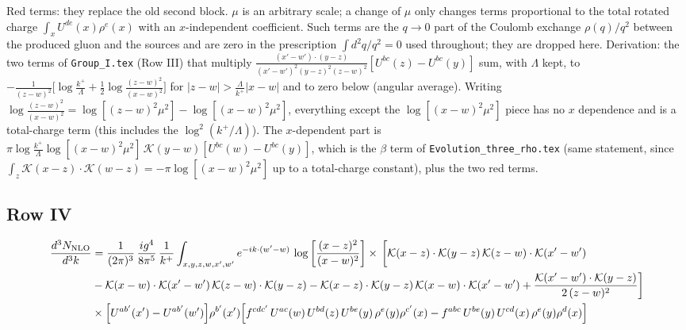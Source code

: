\documentclass[9pt]{article}
\numberwithin{equation}{section}
\begin{document}
{\color{red}Red terms: they replace the old second block. $\mu$ is an arbitrary scale; a change of $\mu$ only changes terms proportional to the total rotated charge $\int_{x}U^{de}(x)\rho^{e}(x)$ with an $x$-independent coefficient. Such terms are the $q\to0$ part of the Coulomb exchange $\rho(q)/q^{2}$ between the produced gluon and the sources and are zero in the prescription $\int d^{2}q/q^{2}=0$ used throughout; they are dropped here. Derivation: the two terms of \texttt{Group\_I.tex} (Row III) that multiply $\frac{(x'-w')\cdot(y-z)}{(x'-w')^{2}(y-z)^{2}(z-w)^{2}}[U^{bc}(z)-U^{bc}(y)]$ sum, with $\Lambda$ kept, to $-\frac{1}{(z-w)^{2}}\big[\log\frac{k^{+}}{\Lambda}+\frac12\log\frac{(z-w)^{2}}{(x-w)^{2}}\big]$ for $|z-w|>\frac{\Lambda}{k^{+}}|x-w|$ and to zero below (angular average). Writing $\log\frac{(z-w)^{2}}{(x-w)^{2}}=\log[(z-w)^{2}\mu^{2}]-\log[(x-w)^{2}\mu^{2}]$, everything except the $\log[(x-w)^{2}\mu^{2}]$ piece has no $x$ dependence and is a total-charge term (this includes the $\log^{2}(k^{+}/\Lambda)$). The $x$-dependent part is $\pi\log\frac{k^{+}}{\Lambda}\log[(x-w)^{2}\mu^{2}]\,\mathcal{K}(y-w)[U^{bc}(w)-U^{bc}(y)]$, which is the $\beta$ term of \texttt{Evolution\_three\_rho.tex} (same statement, since $\int_{z}\mathcal{K}(x-z)\cdot\mathcal{K}(w-z)=-\pi\log[(x-w)^{2}\mu^{2}]$ up to a total-charge constant), plus the two red terms.}

\subsection{Row IV}
\begin{align}
\frac{d^{3}N_{\rm NLO}}{d^{3}k} & = \frac{1}{(2\pi)^{3}}\,\frac{ig^{4}}{8\pi^{5}}\,\frac{1}{k^{+}}\int_{x,y,z,w,x',w'}e^{-ik\cdot(w'-w)}\,\log\left[\frac{(x-z)^{2}}{(x-w)^{2}}\right]\times\,\bigg[\mathcal{K}(x-z)\cdot\mathcal{K}(y-z)\,\mathcal{K}(z-w)\cdot\mathcal{K}(x'-w')\notag \\ & -\mathcal{K}(x-w)\cdot\mathcal{K}(x'-w')\,\mathcal{K}(z-w)\cdot\mathcal{K}(y-z)-\mathcal{K}(x-z)\cdot\mathcal{K}(y-z)\,\mathcal{K}(x-w)\cdot\mathcal{K}(x'-w')+\frac{\mathcal{K}(x'-w')\cdot\mathcal{K}(y-z)}{2\,(z-w)^{2}}\bigg]\notag \\ & \times\Big[U^{ab'}(x')-U^{ab'}(w')\Big]\rho^{b'}(x')\Big[f^{cdc'}\,U^{ac}(w)\,U^{bd}(z)\,U^{be}(y)\,\rho^{e}(y)\rho^{c'}(x)-f^{abc}\,U^{be}(y)\,U^{cd}(x)\,\rho^{e}(y)\rho^{d}(x)\Big]
\end{align}
\end{document}
